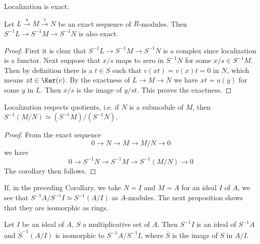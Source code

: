 \begin{proposition}
\label{proposition-localization-exact}
\begin{slogan}
Localization is exact.
\end{slogan}
Let $L\xrightarrow{u} M\xrightarrow{v} N$ be an exact sequence
of $R$-modules. Then
$S^{-1}L \to S^{-1}M \to S^{-1}N$ is also exact.
\end{proposition}

\begin{proof}
First it is clear that $S^{-1}L \to S^{-1}M \to S^{-1}N$ is a complex
since localization is a functor. Next suppose that $x/s$ maps to zero
in $S^{-1}N$ for some $x/s \in S^{-1}M$. Then by definition there is a
$t\in S$ such that $v(xt) = v(x)t = 0$ in $N$, which means
$xt \in \Ker(v)$. By the exactness of $L \to M \to N$ we have
$xt = u(y)$ for some $y$ in $L$. Then $x/s$ is the image of $y/st$.
This proves the exactness.
\end{proof}

\begin{lemma}
\label{lemma-localize-quotient-modules}
Localization respects quotients, i.e. if $N$ is a submodule of
$M$, then $S^{-1}(M/N)\simeq (S^{-1}M)/(S^{-1}N)$.
\end{lemma}

\begin{proof}
From the exact sequence
$$
0 \longrightarrow N \longrightarrow M \longrightarrow M/N \longrightarrow 0
$$
we have
$$
0 \longrightarrow S^{-1}N \longrightarrow S^{-1}M
\longrightarrow S^{-1}(M/N) \longrightarrow 0
$$
The corollary then follows.
\end{proof}

\noindent
If, in the preceding Corollary, we take $N = I$ and $M = A$ for an ideal $I$ of
$A$, we see that $S^{-1}A/S^{-1}I \simeq S^{-1}(A/I)$ as $A$-modules. The next
proposition shows that they are isomorphic as rings.

\begin{proposition}
\label{proposition-localize-quotient}
Let $I$ be an ideal of $A$, $S$ a multiplicative set of $A$. Then
$S^{-1}I$ is an ideal of $S^{-1}A$ and $\overline{S}^{-1}(A/I)$ is
isomorphic to $S^{-1}A/S^{-1}I$, where $\overline{S}$ is
the image of $S$ in $A/I$.
\end{proposition}

